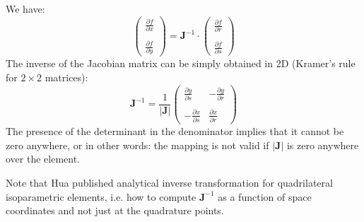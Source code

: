 We have:
\[
\left(
\begin{array}{c}
\frac{\partial f}{\partial x} \\ \\
\frac{\partial f}{\partial y}
\end{array}
\right)
=
{\bm J}^{-1} \cdot 
\left(
\begin{array}{c}
\frac{\partial f}{\partial r} \\ \\
\frac{\partial f}{\partial s}
\end{array}
\right)
\]
The inverse of the Jacobian matrix can be simply obtained in 
2D (Kramer's rule for $2\times2$ matrices):
\[
{\bm J}^{-1} = \frac{1}{|{\bm J}|} 
\left(
\begin{array}{cc}
\frac{\partial y}{\partial s} & -\frac{\partial y}{\partial r} \nonumber\\ \\
-\frac{\partial x}{\partial s} & \frac{\partial x}{\partial r} \nonumber
\end{array}
\right)
\]
The presence of the determinant in the denominator implies that it cannot 
be zero anywhere, or in other words: the mapping is not valid if $|{\bm J}|$
is zero anywhere over the element.

Note that Hua \cite{hua90} published analytical inverse transformation for quadrilateral
isoparametric elements, i.e. how to compute ${\bm J}^{-1}$ as a function of space coordinates
and not just at the quadrature points. 

